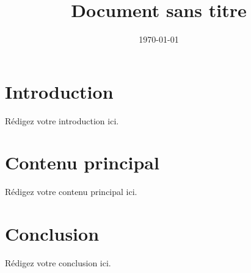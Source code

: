 \documentclass{article}
\title{Document sans titre}
\author{}
\date{\today}
\begin{document}
\maketitle

\section{Introduction}
Rédigez votre introduction ici.

\section{Contenu principal}
Rédigez votre contenu principal ici.

\section{Conclusion}
Rédigez votre conclusion ici.
\end{document}
